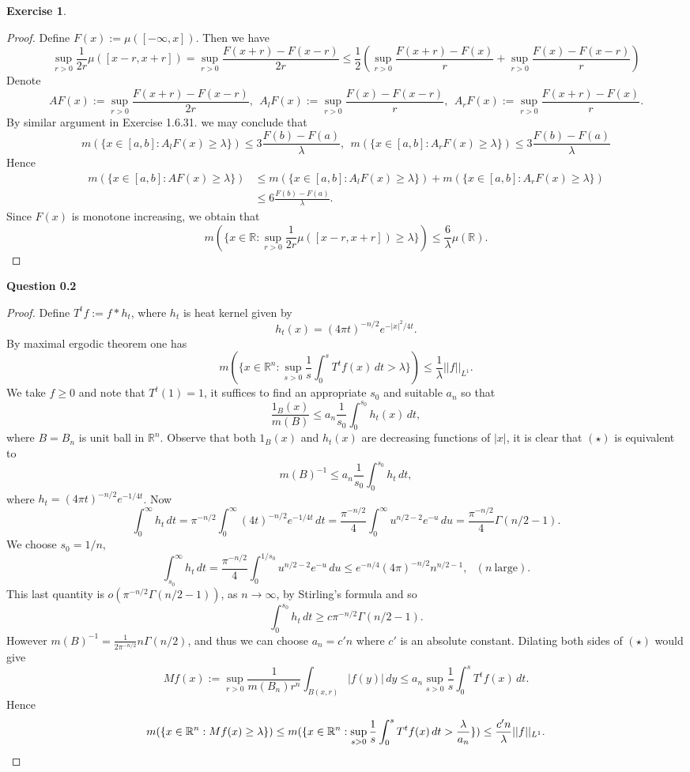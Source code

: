 \documentclass[a4paper]{article}
\newtheorem{ex}{Exercise}[subsection]
\begin{document}
\begin{ex}\end{ex}\begin{proof}
Define $F(x) := \mu([-\infty, x])$. Then we have $$
\sup_{r > 0}\frac{1}{2r}\mu([x - r, x + r]) = \sup_{r > 0} \frac{F(x + r) - F(x - r)}{2r} \leq \frac{1}{2}
(\sup_{r > 0} \frac{F(x + r) - F(x)}{r} + \sup_{r > 0}\frac{F(x) - F(x - r)}{r})
$$Denote$$
AF(x) := \sup_{r > 0} \frac{F(x + r) - F(x - r)}{2r},\ \ A_lF(x) := \sup_{r > 0}\frac{F(x) - F(x - r)}{r},\ \ 
A_rF(x) := \sup_{r > 0} \frac{F(x + r) - F(x)}{r}.
$$By similar argument in Exercise 1.6.31. we may conclude that$$
m(\{x \in [a, b] : A_lF(x) \geq \lambda\}) \leq 3\frac{F(b) - F(a)}{\lambda},\ \ 
m(\{x \in [a, b] : A_rF(x) \geq \lambda\}) \leq 3\frac{F(b) - F(a)}{\lambda}
$$Hence \begin{align*}
m(\{x \in [a, b] : AF(x) \geq \lambda\}) &\leq m(\{x \in [a, b] : A_lF(x) \geq \lambda\}) + m(\{x \in [a, b] : A_rF(x) \geq \lambda\})\\
&\leq 6\frac{F(b) - F(a)}{\lambda}.
\end{align*}
Since $F(x)$ is monotone increasing, we obtain that $$
m(\{x \in \mathbb{R} : \sup_{r > 0}\frac{1}{2r}\mu([x - r, x + r]) \geq \lambda\}) \leq \frac{6}{\lambda}\mu(\mathbb{R}).
$$
\end{proof}

\noindent\bfseries{Question 0.2}\begin{proof}
Define $T^tf := f * h_t$, where $h_t$ is heat kernel given by$$
h_t(x) = (4\pi t)^{-n/2}e^{-|x|^2/4t}.
$$By maximal ergodic theorem one has $$
m(\{x \in \mathbb{R}^n : \sup_{s > 0}\frac{1}{s}\int_0^s T^tf(x)\,dt > \lambda\}) \leq \frac{1}{\lambda}||f||_{L^1}.
$$
We take $f \geq 0$ and note that $T^t(1) = 1$, it suffices to find an appropriate $s_0$ and suitable $a_n$ so that \[
\frac{1_B(x)}{m(B)} \leq a_n\frac{1}{s_0}\int_0^{s_0}h_t(x)\,dt,\tag{$\star$}
\]where $B = B_n$ is unit ball in $\mathbb{R}^n$. Observe that both $1_B(x)$ and $h_t(x)$ are decreasing functions of $|x|$,
it is clear that $(\star)$ is equivalent to $$
m(B)^{-1} \leq a_n\frac{1}{s_0}\int_0^{s_0}h_t\,dt,
$$where $h_t = (4\pi t)^{-n/2}e^{-1/4t}$. Now $$
\int_0^\infty h_t\,dt = \pi^{-n/2}\int_0^\infty (4t)^{-n/2}e^{-1/4t}\,dt = 
\frac{\pi^{-n/2}}{4}\int_0^\infty u^{n/2 - 2}e^{-u}\,du = \frac{\pi^{-n/2}}{4}\Gamma(n/2 - 1).
$$We choose $s_0 = 1/n$, $$
\int_{s_0}^\infty h_t\,dt = \frac{\pi^{-n/2}}{4}\int_0^{1/s_0}u^{n/2 - 2}e^{-u}\,du \leq e^{-n/4}(4\pi)^{-n/2}n^{n/2 - 1}, 
\ \ \ (n\ \text{large}).
$$This last quantity is $o(\pi^{-n/2}\Gamma(n/2 - 1))$, as $n \to \infty$, by Stirling's formula and so 
$$\int_0^{s_0}h_t\,dt \geq c\pi^{-n/2}\Gamma(n/2 - 1).$$ However $m(B)^{-1} = \frac{1}{2\pi^{-n/2}}n\Gamma(n / 2)$,
and thus we can choose $a_n = c'n$ where $c'$ is an absolute constant.
Dilating both sides of $(\star)$ would give $$
Mf(x) := \sup_{r > 0} \frac{1}{m(B_n)r^n}\int_{B(x, r)}|f(y)|\,dy \leq a_n\sup_{s > 0}\frac{1}{s}\int_0^s T^tf(x)\,dt.
$$Hence \[
m(\{x \in \mathbb{R}^n : Mf(x) \geq \lambda\}) \leq 
m(\{x \in \mathbb{R}^n : \sup_{s > 0}\frac{1}{s}\int_0^s T^tf(x)\,dt > \frac{\lambda}{a_n}\}) \leq \frac{c'n}{\lambda}||f||_{L^1}.
\qedhere
\]
\end{proof}
\end{document}
